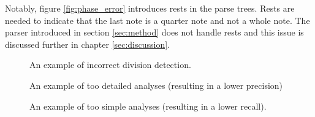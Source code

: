 Notably, figure \ref{fig:phase_error} introduces rests in the parse trees. Rests are needed to indicate that the last note is a quarter note and not a whole note. The parser introduced in section \ref{sec:method} does not handle rests and this issue is discussed further in chapter \ref{sec:discussion}.
\begin{figure}
\centering
{}
\caption{An example of incorrect division detection.}
\label{fig:div_error}
\end{figure}


\begin{figure}
\centering
{}
\caption{An example of too detailed analyses (resulting in a lower precision)}
\label{fig:precision_error}
\end{figure}

\begin{figure}
\centering
\caption{An example of too simple analyses (resulting in a lower recall).}
\label{fig:recall_error}
\end{figure}



